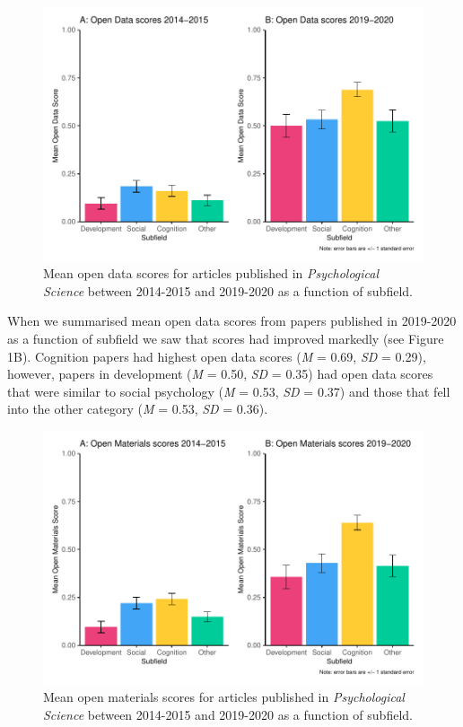 \documentclass[
  english,
  man,floatsintext]{apa6}
\begin{document}
\begin{figure}
\centering
\includegraphics{icd_special_issue_revision_files/figure-latex/unnamed-chunk-2-1.pdf}
\caption{\label{fig:unnamed-chunk-2}Mean open data scores for articles published in \emph{Psychological Science} between 2014-2015 and 2019-2020 as a function of subfield.}
\end{figure}

When we summarised mean open data scores from papers published in 2019-2020 as a function of subfield we saw that scores had improved markedly (see Figure 1B). Cognition papers had highest open data scores (\emph{M} = 0.69, \emph{SD} = 0.29), however, papers in development (\emph{M} = 0.50, \emph{SD} = 0.35) had open data scores that were similar to social psychology (\emph{M} = 0.53, \emph{SD} = 0.37) and those that fell into the other category (\emph{M} = 0.53, \emph{SD} = 0.36).

\begin{figure}
\centering
\includegraphics{icd_special_issue_revision_files/figure-latex/unnamed-chunk-3-1.pdf}
\caption{\label{fig:unnamed-chunk-3}Mean open materials scores for articles published in \emph{Psychological Science} between 2014-2015 and 2019-2020 as a function of subfield.}
\end{figure}
\end{document}
